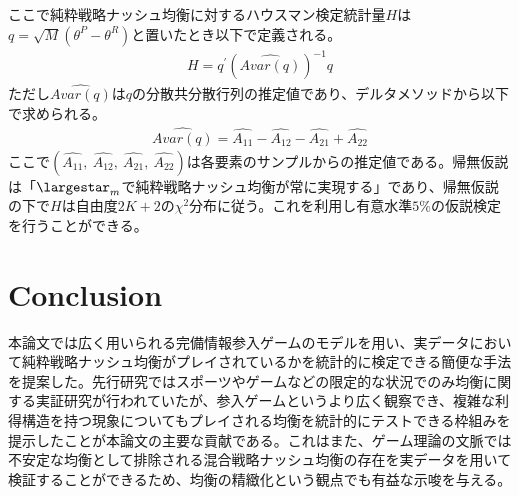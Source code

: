 \documentclass{jsarticle}
\begin{document}
ここで純粋戦略ナッシュ均衡に対するハウスマン検定統計量$H$は$q = \sqrt{M} (\theta^P - \theta^R)$と置いたとき以下で定義される。
\begin{align*}
H = q^{'} \left( \hat{Avar\left( q \right)} \right)^{-1} q
\end{align*}
ただし$\hat{Avar\left( q \right)}$は$q$の分散共分散行列の推定値であり、デルタメソッドから以下で求められる。
\begin{align*}
	\hat{Avar\left( q \right)} = \hat{A_{11}} - \hat{A_{12}} - \hat{A_{21}} + \hat{A_{22}} 
\end{align*}
ここで$\left(\hat{A_{11}},\ \hat{A_{12}},\ \hat{A_{21}},\ \hat{A_{22}} \right)$は各要素のサンプルからの推定値である。帰無仮説は「$\largestar_m$で純粋戦略ナッシュ均衡が常に実現する」であり、帰無仮説の下で$H$は自由度$2K + 2$の$\chi^2$分布に従う。これを利用し有意水準$5\%$の仮説検定を行うことができる。

\section{Conclusion}
本論文では広く用いられる完備情報参入ゲームのモデルを用い、実データにおいて純粋戦略ナッシュ均衡がプレイされているかを統計的に検定できる簡便な手法を提案した。先行研究ではスポーツやゲームなどの限定的な状況でのみ均衡に関する実証研究が行われていたが、参入ゲームというより広く観察でき、複雑な利得構造を持つ現象についてもプレイされる均衡を統計的にテストできる枠組みを提示したことが本論文の主要な貢献である。これはまた、ゲーム理論の文脈では不安定な均衡として排除される混合戦略ナッシュ均衡の存在を実データを用いて検証することができるため、均衡の精緻化という観点でも有益な示唆を与える。
\end{document}
